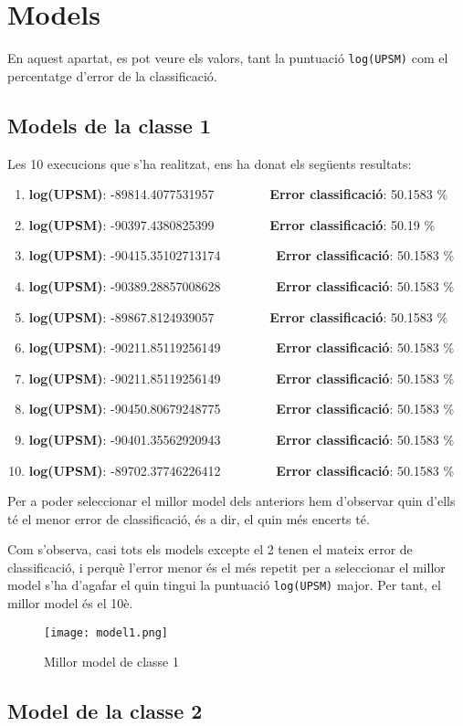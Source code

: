 \documentclass[../informe.tex]{subfiles}
\begin{document}
    \section{Models}
    En aquest apartat, es pot veure els valors, tant la puntuació \texttt{log(UPSM)} com el percentatge d'error de la classificació.
    
    \subsection{Models de la classe 1}
    Les 10 execucions que s'ha realitzat, ens ha donat els següents resultats:
    \begin{enumerate}
        \item \textbf{log(UPSM)}: -89814.4077531957 \ \ \ \ \ \ \ \ \textbf{Error classificació}: 50.1583 \%
        \item \textbf{log(UPSM)}: -90397.4380825399 \ \ \ \ \ \ \ \ \textbf{Error classificació}: 50.19 \%
        \item \textbf{log(UPSM)}: -90415.35102713174 \ \ \ \ \ \ \ \ \textbf{Error classificació}: 50.1583 \%
        \item \textbf{log(UPSM)}: -90389.28857008628 \ \ \ \ \ \ \ \ \textbf{Error classificació}: 50.1583 \%
        \item \textbf{log(UPSM)}: -89867.8124939057 \ \ \ \ \ \ \ \ \textbf{Error classificació}: 50.1583 \%
        \item \textbf{log(UPSM)}: -90211.85119256149 \ \ \ \ \ \ \ \ \textbf{Error classificació}: 50.1583 \%
        \item \textbf{log(UPSM)}: -90211.85119256149 \ \ \ \ \ \ \ \ \textbf{Error classificació}: 50.1583 \%
        \item \textbf{log(UPSM)}: -90450.80679248775 \ \ \ \ \ \ \ \ \textbf{Error classificació}: 50.1583 \%
        \item \textbf{log(UPSM)}: -90401.35562920943 \ \ \ \ \ \ \ \ \textbf{Error classificació}: 50.1583 \%
        \item \textbf{log(UPSM)}: -89702.37746226412 \ \ \ \ \ \ \ \ \textbf{Error classificació}: 50.1583 \%
    \end{enumerate}

    Per a poder seleccionar el millor model dels anteriors hem d'observar quin d'ells té el menor error de classificació, és a dir, el quin més encerts té.

    \medskip
    Com s'observa, casi tots els models excepte el 2 tenen el mateix error de classificació, i perquè l'error menor és el més repetit per a seleccionar el millor model s'ha d'agafar el quin tingui la puntuació \texttt{log(UPSM)} major. Per tant, el millor model és el 10è.

    \begin{figure}[H]
        \centering
        \texttt{[image: model1.png]}
        \caption{Millor model de classe 1}
        \label{fig:model1}
    \end{figure}

    \medskip
    \subsection{Model de la classe 2}
\end{document}
